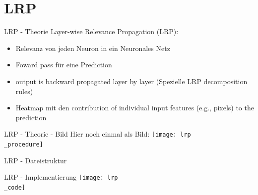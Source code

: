\documentclass[ngerman,14pt,aspectratio=1610]{beamer}
\def\secname{Gliederung} %
\let\oldsection\section
\renewcommand{\section}[1]{
	\oldsection{#1}
	\newtotcounter{#1}
	\def\secname{#1}
}
\begin{document}
	\section{LRP}
		\begin{frame}[t]{LRP - Theorie} \vspace{20pt}
			Layer-wise Relevance Propagation (LRP):
			\begin{itemize}
				\item Relevanz von jeden Neuron in ein Neuronales Netz
				\item Foward pass für eine Prediction
				\item  output is backward propagated layer by layer (Spezielle LRP decomposition rules)
				\item Heatmap mit den contribution of individual input features (e.g., pixels) to the prediction
			\end{itemize}
		\end{frame}
		
		\begin{frame}[t]{LRP - Theorie - Bild} \vspace*{\fill}
			Hier noch einmal als Bild:
			\texttt{[image: lrp\\\_procedure]}
		\end{frame}
		
		\begin{frame}[t]{LRP - Dateistruktur} \vspace{20pt}		
			\begin{figure}[h]
				\centering
			\end{figure} 
		\end{frame}
		
		\begin{frame}[t]{LRP - Implementierung}
			 \vspace*{\fill}
			 \centering
			\texttt{[image: lrp\\\_code]}
		\end{frame}
		
\end{document}
